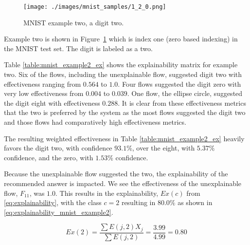 \begin{figure}[H]
    \centerline{\texttt{[image: ./images/mnist\_samples/1\_2\_0.png]}}
    \caption{MNIST example two, a digit two.}
    \label{fig:mnist_example2}
\end{figure}

Example two is shown in Figure~\ref{fig:mnist_example2} which is index one (zero
based indexing) in the MNIST test set. The digit is labeled as a two.

Table \ref{table:mnist_example2_ex} shows the explainability matrix for example
two. Six of the flows, including the unexplainable flow, suggested digit two
with effectiveness ranging from $0.564$ to $1.0$. Four flows suggested the digit
zero with very low effectiveness from $0.004$ to $0.039$. One flow, the ellipse
circle, suggested the digit eight with effectiveness $0.288$.  It is clear from
these effectiveness metrics that the two is preferred by the system as the most
flows suggested the digit two and those flows had comparatively high
effectiveness metrics.

The resulting weighted effectiveness in Table \ref{table:mnist_example2_ex}
heavily favors the digit two, with confidence $93.1\%$, over the eight, with
$5.37\%$ confidence, and the zero, with $1.53\%$ confidence.

Because the unexplainable flow suggested the two, the explainability of the
recommended answer is impacted.  We see the effectiveness of the unexplainable
flow, $F_{11}$, was $1.0$.  This results in the explainability, $Ex(c)$ from
\eqref{eq:explainability}, with the class $c=2$ resulting in $80.0\%$ as shown
in \eqref{eq:explainability_mnist_example2}.

\begin{equation}\label{eq:explainability_mnist_example2}
    Ex(2)=\frac{\sum{E(j,2)X_j}}{\sum{E(j,2)}} = \frac{3.99}{4.99}=0.80
\end{equation}

